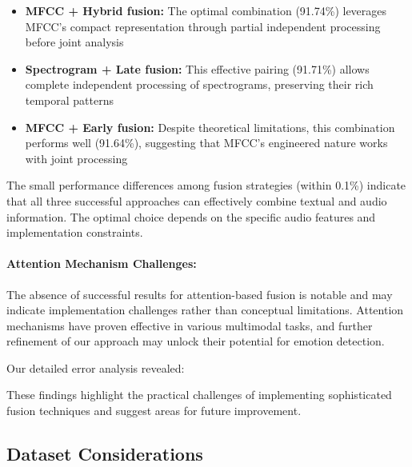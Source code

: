 \documentclass[12pt]{article}
\begin{document}
\begin{itemize}
    \item \textbf{MFCC + Hybrid fusion:} The optimal combination (91.74\%) leverages MFCC's compact representation through partial independent processing before joint analysis

    \item \textbf{Spectrogram + Late fusion:} This effective pairing (91.71\%) allows complete independent processing of spectrograms, preserving their rich temporal patterns

    \item \textbf{MFCC + Early fusion:} Despite theoretical limitations, this combination performs well (91.64\%), suggesting that MFCC's engineered nature works with joint processing
\end{itemize}

The small performance differences among fusion strategies (within 0.1\%) indicate that all three successful approaches can effectively combine textual and audio information. The optimal choice depends on the specific audio features and implementation constraints.

\paragraph{Attention Mechanism Challenges:}
The absence of successful results for attention-based fusion is notable and may indicate implementation challenges rather than conceptual limitations. Attention mechanisms have proven effective in various multimodal tasks, and further refinement of our approach may unlock their potential for emotion detection.

Our detailed error analysis revealed:

These findings highlight the practical challenges of implementing sophisticated fusion techniques and suggest areas for future improvement.

\subsection{Dataset Considerations}
\end{document}
